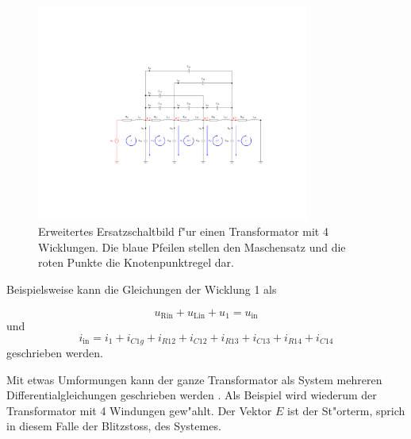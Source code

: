 \begin{refsection}
\begin{figure}
	\centering
	\includegraphics[width=0.8\textwidth]{./trafo/images/orig_trafo.pdf}
	\caption[Erweitertes Ersatzschaltbild f"ur einen Transformator mit Maschensatz und Knotenpunkt]{Erweitertes Ersatzschaltbild f"ur einen Transformator mit 4 Wicklungen. Die blaue Pfeilen stellen den Maschensatz und die roten Punkte die Knotenpunktregel dar.}
	\label{trafo:orig}
\end{figure}

Beispielsweise kann die Gleichungen der Wicklung 1 als 

\begin{equation*}
	u_\mathrm{Rin} + u_\mathrm{Lin} + u_1 = u_\mathrm{in}
\end{equation*}
und 
\begin{equation}
	i_\mathrm{in} = i_1 + i_{C1g} + i_{R12} + i_{C12} + i_{R13} + i_{C13} + i_{R14} + i_{C14}
\end{equation}
geschrieben werden. 

Mit etwas Umformungen kann der ganze Transformator als System mehreren Differentialgleichungen geschrieben werden \cite{trafo:SeminarCHR}. Als Beispiel wird wiederum der Transformator mit 4 Windungen gew"ahlt. Der Vektor $E$ ist der St"orterm, sprich in diesem Falle der Blitzstoss, des Systemes.


\end{refsection}
